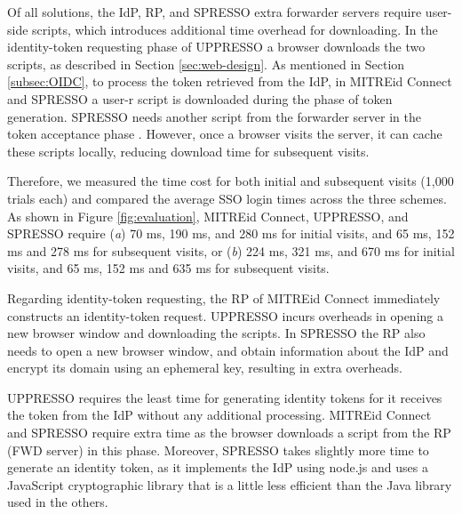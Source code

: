 Of all solutions, the IdP, RP, and SPRESSO extra forwarder servers require user-side scripts, which introduces additional time overhead for downloading. 
In the identity-token requesting phase of UPPRESSO a browser downloads the two scripts,
    as described in Section \ref{sec:web-design}.
As mentioned in Section \ref{subsec:OIDC},
 to process the token retrieved from the IdP, %
    in MITREid Connect and SPRESSO a user-r script is downloaded during the phase of token generation.
SPRESSO needs another script from the forwarder server in the token acceptance phase \cite{SPRESSO}.
However, once a browser visits the server, it can cache these scripts locally, reducing download time for subsequent visits. 

Therefore, we measured the time cost for both initial and subsequent visits (1,000 trials each) and compared the average SSO login times across the three schemes. As shown in Figure \ref{fig:evaluation},
MITREid Connect, UPPRESSO, and SPRESSO require (\emph{a}) 70 ms, 190 ms, and 280 ms for initial visits, and 65 ms, 152 ms and 278 ms for subsequent visits,
 or (\emph{b}) 224 ms, 321 ms, and 670 ms for initial visits, and 65 ms, 152 ms and 635 ms for subsequent visits.

Regarding identity-token requesting, %
the RP of MITREid Connect immediately constructs an identity-token request. %
UPPRESSO incurs overheads in opening a new browser window and downloading the scripts.
%
%
In SPRESSO the RP also needs to open a new browser window, and obtain information about the IdP %
and encrypt its domain using an ephemeral key, resulting in extra overheads.

UPPRESSO requires the least time for generating identity tokens for it receives the token from the IdP without any additional processing.
MITREid Connect and SPRESSO require extra time as the browser downloads a script from the RP (FWD server) in this phase. %
Moreover, SPRESSO takes slightly more time to generate an identity token, as it implements the IdP using node.js and uses a JavaScript cryptographic library that is a little less efficient than the Java library used in the others.

